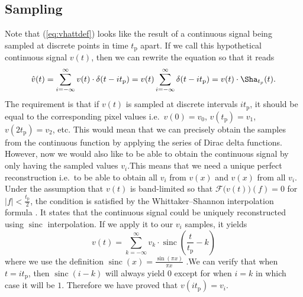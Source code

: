 \documentclass[a4paper,12pt,twoside,openright]{report}
\begin{document}
\subsection{Sampling}
Note that (\ref{eq:vhattdef}) looks like the result of a continuous signal being sampled at discrete points in time $t_\text{p}$ apart. If we call this hypothetical continuous signal $v(t)$, then we can rewrite the equation so that it reads
\begin{equation}
\hat{v}(t) = \sum\limits_{i=-\infty}^{\infty} v(t) \cdot \delta(t-i t_\text{p}) = v(t) \sum\limits_{i=-\infty}^{\infty} \delta(t-i t_\text{p}) = v(t) \cdot \Sha_{t_{p}}(t) .
\end{equation}
The requirement is that if $v(t)$ is sampled at discrete intervals $i t_\text{p}$, it should be equal to the corresponding pixel values i.e.\  $v(0)=v_{0}$, $v(t_\text{p})=v_{1}$, $v(2 t_\text{p})=v_{2}$, etc. This would mean that we can precisely obtain the samples from the continuous function by applying the series of Dirac delta functions. However, now we would also like to be able to obtain the continuous signal by only having the sampled values $v_{i}$.This means that we need a unique perfect reconstruction i.e.\  to be able to obtain all $v_{i}$ from $v(x)$ and $v(x)$ from all $v_{i}$. Under the assumption that $v(t)$ is band-limited so that $\mathcal{F}\big( v(t) \big)(f) = 0$ for $|f| < \frac{t_\text{p}}{2}$, the condition is satisfied by the Whittaker--Shannon interpolation formula \cite{shannon1949communication}. It states that the continuous signal could be uniquely reconstructed using $\operatorname{sinc}$ interpolation. If we apply it to our $v_{i}$ samples, it yields
\begin{equation}
v(t) = \sum\limits_{k=-\infty}^{\infty} v_{k} \cdot \operatorname{sinc} \left( \frac{t}{t_\text{p}} - k \right)
\end{equation}
where we use the definition $ \operatorname{sinc}(x) = \frac{\sin(\pi x)}{\pi x}$ .We can verify that when $t=i t_\text{p}$, then $\operatorname{sinc}(i-k)$ will always yield $0$ except for when $i = k$ in which case it will be $1$. Therefore we have proved that $v(i t_\text{p}) = v_{i}$.
\end{document}
